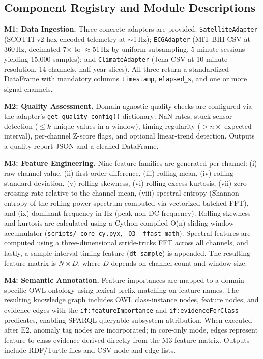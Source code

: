 \documentclass[conference]{IEEEtran}
\begin{document}
\subsection{Component Registry and Module Descriptions}

\textbf{M1: Data Ingestion.} Three concrete adapters are provided: \texttt{SatelliteAdapter} (SCOTTI v2 hex-encoded telemetry at $\sim$1\,Hz); \texttt{ECGAdapter} (MIT-BIH CSV at 360\,Hz, decimated 7$\times$ to $\approx$51\,Hz by uniform subsampling, 5-minute sessions yielding 15,000 samples); and \texttt{ClimateAdapter} (Jena CSV at 10-minute resolution, 14 channels, half-year slices). All three return a standardized DataFrame with mandatory columns \texttt{timestamp}, \texttt{elapsed\_s}, and one or more signal channels.

\textbf{M2: Quality Assessment.} Domain-agnostic quality checks are configured via the adapter's \texttt{get\_quality\_config()} dictionary: NaN rates, stuck-sensor detection ($\le k$ unique values in a window), timing regularity ($> n\times$ expected interval), per-channel Z-score flags, and optional linear-trend detection. Outputs a quality report JSON and a cleaned DataFrame.

\textbf{M3: Feature Engineering.} Nine feature families are generated per channel: (i) raw channel value, (ii) first-order difference, (iii) rolling mean, (iv) rolling standard deviation, (v) rolling skewness, (vi) rolling excess kurtosis, (vii) zero-crossing rate relative to the channel mean, (viii) spectral entropy (Shannon entropy of the rolling power spectrum computed via vectorized batched FFT), and (ix) dominant frequency in Hz (peak non-DC frequency). Rolling skewness and kurtosis are calculated using a Cython-compiled O(n) sliding-window accumulator (\texttt{scripts/\_core\_cy.pyx}, \texttt{-O3 -ffast-math}). Spectral features are computed using a three-dimensional stride-tricks FFT across all channels, and lastly, a sample-interval timing feature (\texttt{dt\_sample}) is appended. The resulting feature matrix is $N \times D$, where $D$ depends on channel count and window size.

\textbf{M4: Semantic Annotation.} Feature importances are mapped to a domain-specific OWL ontology using lexical prefix matching on feature names. The resulting knowledge graph includes OWL class-instance nodes, feature nodes, and evidence edges with the \texttt{if:featureImportance} and \texttt{if:evidenceForClass} predicates, enabling SPARQL-queryable subsystem attribution. When executed after E2, anomaly tag nodes are incorporated; in core-only mode, edges represent feature-to-class evidence derived directly from the M3 feature matrix. Outputs include RDF/Turtle files and CSV node and edge lists.
\end{document}
